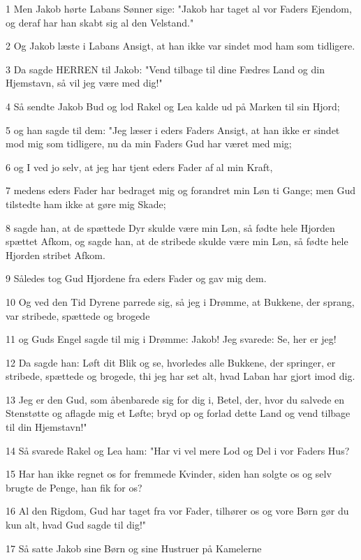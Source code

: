 \par 1 Men Jakob hørte Labans Sønner sige: "Jakob har taget al vor Faders Ejendom, og deraf har han skabt sig al den Velstand."
\par 2 Og Jakob læste i Labans Ansigt, at han ikke var sindet mod ham som tidligere.
\par 3 Da sagde HERREN til Jakob: "Vend tilbage til dine Fædres Land og din Hjemstavn, så vil jeg være med dig!"
\par 4 Så sendte Jakob Bud og lod Rakel og Lea kalde ud på Marken til sin Hjord;
\par 5 og han sagde til dem: "Jeg læser i eders Faders Ansigt, at han ikke er sindet mod mig som tidligere, nu da min Faders Gud har været med mig;
\par 6 og I ved jo selv, at jeg har tjent eders Fader af al min Kraft,
\par 7 medens eders Fader har bedraget mig og forandret min Løn ti Gange; men Gud tilstedte ham ikke at gøre mig Skade;
\par 8 sagde han, at de spættede Dyr skulde være min Løn, så fødte hele Hjorden spættet Afkom, og sagde han, at de stribede skulde være min Løn, så fødte hele Hjorden stribet Afkom.
\par 9 Således tog Gud Hjordene fra eders Fader og gav mig dem.
\par 10 Og ved den Tid Dyrene parrede sig, så jeg i Drømme, at Bukkene, der sprang, var stribede, spættede og brogede
\par 11 og Guds Engel sagde til mig i Drømme: Jakob! Jeg svarede: Se, her er jeg!
\par 12 Da sagde han: Løft dit Blik og se, hvorledes alle Bukkene, der springer, er stribede, spættede og brogede, thi jeg har set alt, hvad Laban har gjort imod dig.
\par 13 Jeg er den Gud, som åbenbarede sig for dig i, Betel, der, hvor du salvede en Stenstøtte og aflagde mig et Løfte; bryd op og forlad dette Land og vend tilbage til din Hjemstavn!"
\par 14 Så svarede Rakel og Lea ham: "Har vi vel mere Lod og Del i vor Faders Hus?
\par 15 Har han ikke regnet os for fremmede Kvinder, siden han solgte os og selv brugte de Penge, han fik for os?
\par 16 Al den Rigdom, Gud har taget fra vor Fader, tilhører os og vore Børn gør du kun alt, hvad Gud sagde til dig!"
\par 17 Så satte Jakob sine Børn og sine Hustruer på Kamelerne
